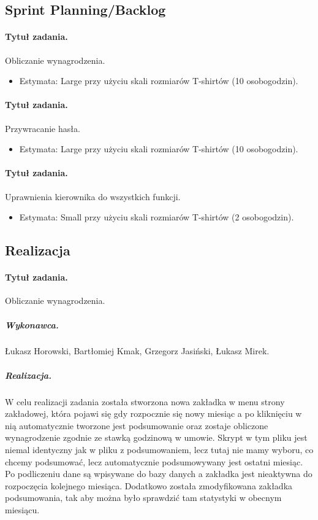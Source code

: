 \documentclass[a4paper]{article}
\begin{document}
\subsection{Sprint Planning/Backlog}

\paragraph{Tytuł zadania.} Obliczanie wynagrodzenia.
\begin{itemize}
\item Estymata: Large przy użyciu skali rozmiarów T-shirtów (10 osobogodzin).
\end{itemize}

\paragraph{Tytuł zadania.} Przywracanie hasła.
\begin{itemize}
\item Estymata: Large przy użyciu skali rozmiarów T-shirtów (10 osobogodzin).
\end{itemize}

\paragraph{Tytuł zadania.} Uprawnienia kierownika do wszystkich funkcji.
\begin{itemize}
\item Estymata: Small przy użyciu skali rozmiarów T-shirtów (2 osobogodzin).
\end{itemize}


\subsection{Realizacja}

\paragraph{Tytuł zadania.} Obliczanie wynagrodzenia.
\subparagraph{Wykonawca.} Łukasz Horowski, Bartłomiej Kmak, Grzegorz Jasiński, Łukasz Mirek.
\subparagraph{Realizacja.}  W celu realizacji zadania została stworzona nowa zakładka w menu strony zakładowej, która pojawi się gdy rozpocznie się nowy miesiąc a po kliknięciu w nią automatycznie tworzone jest podsumowanie oraz zostaje obliczone wynagrodzenie zgodnie ze stawką godzinową w umowie. Skrypt w tym pliku jest niemal identyczny jak w pliku z podsumowaniem, lecz tutaj nie mamy wyboru, co chcemy podsumować, lecz automatycznie podsumowywany jest ostatni miesiąc. Po podliczeniu dane są wpisywane do bazy danych a zakładka jest nieaktywna do rozpoczęcia kolejnego miesiąca. Dodatkowo została zmodyfikowana zakładka podsumowania, tak aby można było sprawdzić tam statystyki w obecnym miesiącu.
\end{document}
